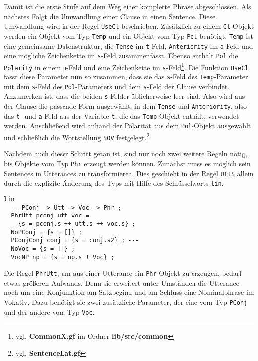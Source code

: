Damit ist die erste Stufe auf dem Weg einer komplette Phrase abgeschlossen. Als nächstes Folgt die Umwandlung einer Clause in einen Sentence. Diese Umwandlung wird in der Regel \texttt{UseCl} beschrieben. Zusätzlich zu einem \texttt{Cl}-Objekt werden ein Objekt vom Typ \texttt{Temp} und ein Objekt vom Typ \texttt{Pol} benötigt. \texttt{Temp} ist eine gemeinsame Datenstruktur, die \texttt{Tense} im \texttt{t}-Feld, \texttt{Anteriority} im \texttt{a}-Feld und eine mögliche Zeichenkette im \texttt{s}-Feld zusammenfasst. Ebenso enthält \texttt{Pol} die \texttt{Polarity} in einem \texttt{p}-Feld und eine Zeichenkette im \texttt{s}-Feld\footnote{vgl. \textbf{CommonX.gf} im Ordner \textbf{lib/src/common}}. Die Funktion \texttt{UseCl} fasst diese Parameter nun so zusammen, dass sie das \texttt{s}-Feld des \texttt{Temp}-Parameter mit dem \texttt{s}-Feld des \texttt{Pol}-Parameters und dem \texttt{s}-Feld der Clause verbindet. Anzumerken ist, dass die beiden \texttt{s}-Felder üblicherweise leer sind. Also wird aus der Clause die passende Form ausgewählt, in dem \texttt{Tense} und \texttt{Anteriority}, also das \texttt{t}- und \texttt{a}-Feld aus der Variable \texttt{t}, die das \texttt{Temp}-Objekt enthält, verwendet werden. Anschließend wird anhand der Polarität aus dem \texttt{Pol}-Objekt ausgewählt und schließlich die Wortstellung \texttt{SOV} festgelegt.\footnote{vgl. \textbf{SentenceLat.gf}} \par
Nachdem auch dieser Schritt getan ist, sind nur noch zwei weitere Regeln nötig, bis Objekte vom Typ \texttt{Phr} erzeugt werden können. Zunächst muss es möglich sein Sentences in Utterances zu transformieren. Dies geschieht in der Regel \texttt{UttS} allein durch die explizite Änderung des Typs mit Hilfe des Schlüsselworts \texttt{lin}. \par
\begin{lstlisting}[float=h!tp,caption={Syntaxregeln um eine Utterance mit einer Konjunktion und einem Vokativ zu einer Phrase zu kombinieren (vgl. \textbf{PhraseLat.gf})},basicstyle=\small,label={GF-Phrase-PhrUtt}]
lin
  -- PConj -> Utt -> Voc -> Phr ;
  PhrUtt pconj utt voc = 
    {s = pconj.s ++ utt.s ++ voc.s} ;
  NoPConj = {s = []} ;
  PConjConj conj = {s = conj.s2} ; ---
  NoVoc = {s = []} ;
  VocNP np = {s = np.s ! Voc} ;
\end{lstlisting}
Die Regel \texttt{PhrUtt}, um aus einer Utterance ein \texttt{Phr}-Objekt zu erzeugen, bedarf etwas größeren Aufwands. Denn sie erweitert unter Umständen die Utterance noch um eine Konjunktion am Satzbeginn und am Schluss eine Nominalphrase im Vokativ. Dazu benötigt sie zwei zusätzliche Parameter, der eine vom Typ \texttt{PConj} und der andere vom Typ \texttt{Voc}. \par
